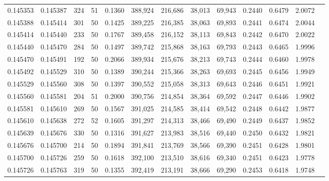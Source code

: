 \begin{tabular}{rrrrrrrrrrrrr}
0.145353 & 0.145387 &   324 &  51 &                                     0.1360 & 388,924 & 216,686 &  38,013 &  69,943 & 0.2440 & 0.6479 & 2.0072 \\
0.145388 & 0.145414 &   301 &  50 &                                     0.1425 & 389,225 & 216,385 &  38,063 &  69,893 & 0.2441 & 0.6474 & 2.0044 \\
0.145414 & 0.145440 &   233 &  50 &                                     0.1767 & 389,458 & 216,152 &  38,113 &  69,843 & 0.2442 & 0.6470 & 2.0022 \\
0.145440 & 0.145470 &   284 &  50 &                                     0.1497 & 389,742 & 215,868 &  38,163 &  69,793 & 0.2443 & 0.6465 & 1.9996 \\
0.145470 & 0.145491 &   192 &  50 &                                     0.2066 & 389,934 & 215,676 &  38,213 &  69,743 & 0.2444 & 0.6460 & 1.9978 \\
0.145492 & 0.145529 &   310 &  50 &                                     0.1389 & 390,244 & 215,366 &  38,263 &  69,693 & 0.2445 & 0.6456 & 1.9949 \\
0.145529 & 0.145560 &   308 &  50 &                                     0.1397 & 390,552 & 215,058 &  38,313 &  69,643 & 0.2446 & 0.6451 & 1.9921 \\
0.145560 & 0.145581 &   204 &  51 &                                     0.2000 & 390,756 & 214,854 &  38,364 &  69,592 & 0.2447 & 0.6446 & 1.9902 \\
0.145581 & 0.145610 &   269 &  50 &                                     0.1567 & 391,025 & 214,585 &  38,414 &  69,542 & 0.2448 & 0.6442 & 1.9877 \\
0.145610 & 0.145638 &   272 &  52 &                                     0.1605 & 391,297 & 214,313 &  38,466 &  69,490 & 0.2449 & 0.6437 & 1.9852 \\
0.145639 & 0.145676 &   330 &  50 &                                     0.1316 & 391,627 & 213,983 &  38,516 &  69,440 & 0.2450 & 0.6432 & 1.9821 \\
0.145676 & 0.145700 &   214 &  50 &                                     0.1894 & 391,841 & 213,769 &  38,566 &  69,390 & 0.2451 & 0.6428 & 1.9801 \\
0.145700 & 0.145726 &   259 &  50 &                                     0.1618 & 392,100 & 213,510 &  38,616 &  69,340 & 0.2451 & 0.6423 & 1.9778 \\
0.145726 & 0.145763 &   319 &  50 &                                     0.1355 & 392,419 & 213,191 &  38,666 &  69,290 & 0.2453 & 0.6418 & 1.9748 \\

\end{tabular}
